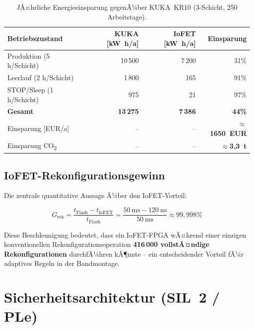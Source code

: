 ﻿\documentclass[a4paper,12pt]{scrreprt}
\theoremstyle{definition}
\begin{document}
\begin{table}[H]
\centering
\caption{JÃ¤hrliche Energieeinsparung gegenÃ¼ber KUKA~KR10 (3-Schicht, 250 Arbeitstage).}
\label{tab:energy_saving}
\small
\begin{tabular}{|l|r|r|r|}
\hline
\rowcolor{fpgagreen!20}
\textbf{Betriebszustand} & \textbf{KUKA [\si{\kilo\watt\hour/a}]} &
  \textbf{IoFET [\si{\kilo\watt\hour/a}]} & \textbf{Einsparung} \\
\hline
Produktion (5 h/Schicht) & 10\,500 & 7\,200 & 31\% \\
\hline
Leerlauf (2 h/Schicht) & 1\,800 & 165 & 91\% \\
\hline
STOP/Sleep (1 h/Schicht) & 975 & 21 & 97\% \\
\hline
\textbf{Gesamt} & \textbf{13\,275} & \textbf{7\,386} & \textbf{44\%} \\
\hline
Einsparung [EUR/a] & -- & -- & \textbf{$\approx$1650~EUR} \\
\hline
Einsparung CO\textsubscript{2} & -- & -- & \textbf{$\approx$3{,}3~t} \\
\hline
\end{tabular}
\end{table}

\subsection{IoFET-Rekonfigurationsgewinn}

Die zentrale quantitative Aussage Ã¼ber den IoFET-Vorteil:

\begin{equation}
  G_{\text{rek}} = \frac{t_{\text{Flash}} - t_{\text{IoFET}}}{t_{\text{Flash}}}
  = \frac{\SI{50}{\milli\second} - \SI{120}{\nano\second}}{\SI{50}{\milli\second}}
  \approx 99{,}998\%
\end{equation}

Diese Beschleunigung bedeutet, dass ein IoFET-FPGA wÃ¤hrend einer
einzigen konventionellen Rekonfigurationsoperation
\textbf{416\,000 vollstÃ¤ndige Rekonfigurationen} durchfÃ¼hren kÃ¶nnte --
ein entscheidender Vorteil fÃ¼r adaptives Regeln in der Bandmontage.

\section{Sicherheitsarchitektur (SIL~2 / PLe)}
\end{document}

